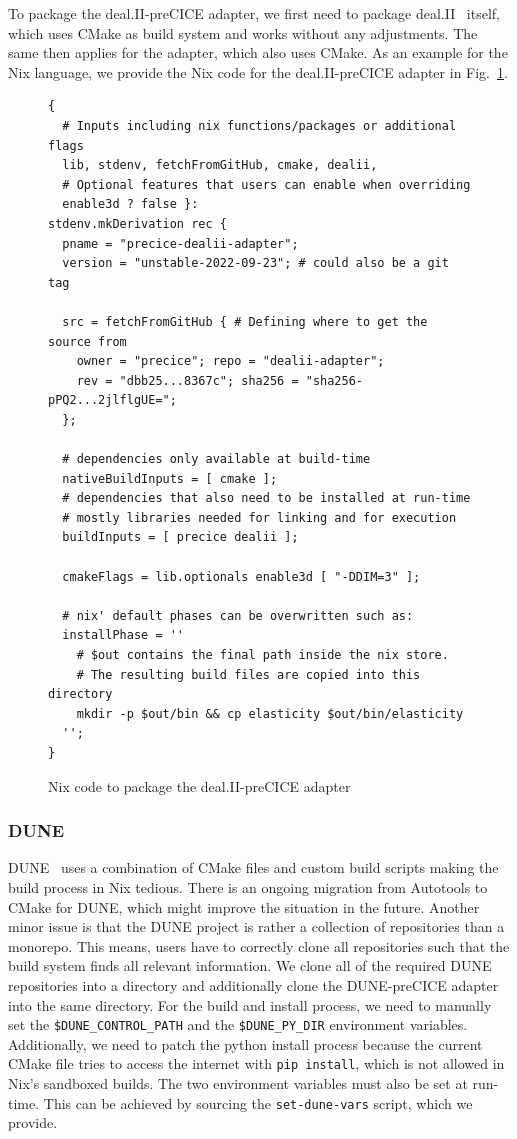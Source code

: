 \documentclass{eceasst}
\begin{document}
To package the deal.II-preCICE adapter, we first need to package deal.II~\cite{dealII95} itself, which uses CMake as build system and works without any adjustments.
The same then applies for the adapter, which also uses CMake.
As an example for the Nix language, we provide the Nix code for the deal.II-preCICE adapter in Fig.~\ref{lst:dealii-adapter-nix}.

\begin{figure}
    \normalsize
    \begin{verbatim}
{
  # Inputs including nix functions/packages or additional flags
  lib, stdenv, fetchFromGitHub, cmake, dealii,
  # Optional features that users can enable when overriding
  enable3d ? false }:
stdenv.mkDerivation rec {
  pname = "precice-dealii-adapter";
  version = "unstable-2022-09-23"; # could also be a git tag

  src = fetchFromGitHub { # Defining where to get the source from
    owner = "precice"; repo = "dealii-adapter";
    rev = "dbb25...8367c"; sha256 = "sha256-pPQ2...2jlflgUE=";
  };

  # dependencies only available at build-time
  nativeBuildInputs = [ cmake ];
  # dependencies that also need to be installed at run-time
  # mostly libraries needed for linking and for execution
  buildInputs = [ precice dealii ];

  cmakeFlags = lib.optionals enable3d [ "-DDIM=3" ];

  # nix' default phases can be overwritten such as:
  installPhase = ''
    # $out contains the final path inside the nix store.
    # The resulting build files are copied into this directory
    mkdir -p $out/bin && cp elasticity $out/bin/elasticity
  '';
}
    \end{verbatim}
    \caption{Nix code to package the deal.II-preCICE adapter}
    \label{lst:dealii-adapter-nix}
\end{figure}

\subsubsection{DUNE}

DUNE~\cite{bastian2020dune} uses a combination of CMake files and custom build scripts making the build process in Nix tedious.
There is an ongoing migration from Autotools to CMake for DUNE, which might improve the situation in the future.
Another minor issue is that the DUNE project is rather a collection of repositories than a monorepo. This means, users have to correctly clone all repositories such that the build system finds all relevant information.
We clone all of the required DUNE repositories into a directory and additionally clone the DUNE-preCICE adapter into the same directory.
For the build and install process, we need to manually set the \texttt{\$DUNE\_CONTROL\_PATH} and the \texttt{\$DUNE\_PY\_DIR} environment variables.
Additionally, we need to patch the python install process because the current CMake file tries to access the internet with \texttt{pip install}, which is not allowed in Nix's sandboxed builds.
The two environment variables must also be set at run-time.
This can be achieved by sourcing the \texttt{set-dune-vars} script, which we provide.
\end{document}
